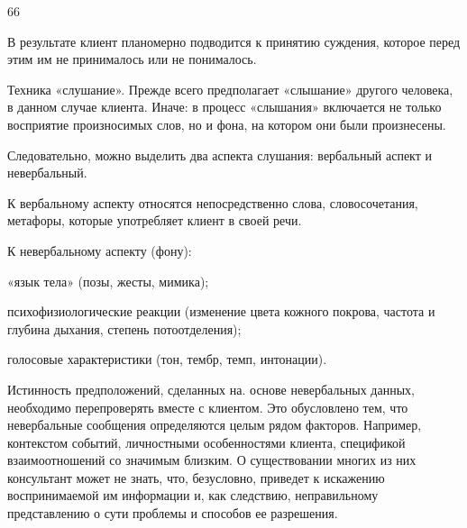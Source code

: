 \documentclass[a4paper, 12pt]{report}
\begin{document}
    66
    
    В результате клиент планомерно подводится к принятию суждения, 
    которое перед этим им не принималось или не понималось.
    
    Техника «слушание». Прежде всего предполагает «слышание» другого 
    человека, в данном случае клиента. Иначе: в процесс «слышания» 
    включается не только восприятие произносимых слов, но и фона, на 
    котором они были произнесены.
    
    Следовательно, можно выделить два аспекта слушания: вербальный 
    аспект и невербальный.
    
    К вербальному аспекту относятся непосредственно слова, словосочетания, 
    метафоры, которые употребляет клиент в своей речи.
    
    К невербальному аспекту (фону):
    
    «язык тела» (позы, жесты, мимика);
    
    психофизиологические реакции (изменение цвета кожного покрова, 
    частота и глубина дыхания, степень потоотделения);
    
    голосовые характеристики (тон, тембр, темп, интонации).
    
    Истинность предположений, сделанных на. основе невербальных данных, 
    необходимо перепроверять вместе с клиентом. Это обусловлено тем, что 
    невербальные сообщения определяются целым рядом факторов. Например, 
    контекстом событий, личностными особенностями клиента, спецификой 
    взаимоотношений со значимым близким. О существовании многих из них 
    консультант может не знать, что, безусловно, приведет к искажению 
    воспринимаемой им информации и, как следствию, неправильному 
    представлению о сути проблемы и способов ее разрешения.
\end{document}
